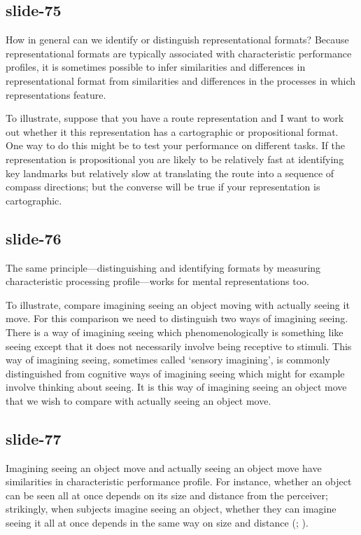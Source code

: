 \documentclass[12pt,\papersize]{extarticle}
\begin{document}
\subsection{slide-75}
How in general can we identify or distinguish representational formats? Because representational formats are typically associated with characteristic performance profiles, it is sometimes possible to infer similarities and differences in representational format from similarities and differences in the processes in which representations feature.
 
To illustrate, suppose that you have a route representation and I want to work out whether it this representation has a cartographic or propositional format. One way to do this might be to test your performance on different tasks. If the representation is propositional you are likely to be relatively fast at identifying key landmarks but relatively slow at translating the route into a sequence of compass directions; but the converse will be true if your representation is cartographic.
 
\subsection{slide-76}
The same principle---distinguishing and identifying formats by measuring characteristic processing
profile---works for mental representations too.
 
To illustrate, compare imagining seeing an object moving with actually seeing it move.
For this comparison we need to distinguish two ways of imagining seeing. There is a way of
imagining seeing which phenomenologically is something like seeing except that it does not
necessarily involve being receptive to stimuli. This way of imagining seeing, sometimes
called `sensory imagining', is commonly distinguished from cognitive ways of imagining
seeing which might for example involve thinking about seeing.
It is this way of imagining seeing an object move that we wish to compare with actually
seeing an object move.
 
\subsection{slide-77}
Imagining seeing an object move and actually seeing an object move have similarities in
characteristic performance profile. For instance, whether an object can be seen all at once depends
on its size and distance from the perceiver; strikingly, when subjects imagine seeing an object,
whether they can imagine seeing it all at once depends in the same way on size and distance
(\citealp{kosslyn:1978_measuring}; \citealp[p.\ 99ff]{kosslyn:1994_image}).
 
\end{document}
